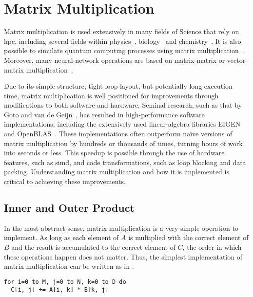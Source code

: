 \documentclass[\main/thesis.tex]{subfiles}
\begin{document}
\chapter{Matrix Multiplication}
\label{cha:matmul}
Matrix multiplication is used extensively in many fields of Science that rely on \gls{hpc}, including several fields within physics~\autocite{krol2014matrix}, biology~\autocite{akutsu2000algorithms} and chemistry~\autocite{weber2015semiempirical}.
It is also possible to simulate quantum computing processes using matrix multiplication~\autocite{zulehner2019matrix}.
Moreover, many neural-network operations are based on matrix-matrix or vector-matrix multiplication~\autocite{rojas1996neural,blue1992training}.

Due to its simple structure, tight loop layout, but potentially long execution time, matrix multiplication is well positioned for improvements through modifications to both software and hardware.
Seminal research, such as that by Goto and van de Geijn~\autocite{goto2008anatomy}, has resulted in high-performance software implementations, including the extensively used linear-algebra libraries EIGEN~\autocite{guennebaud2021eigen} and OpenBLAS~\autocite{xianyi2012model}.
These implementations often outperform na\"ive versions of matrix multiplication by hundreds or thousands of times, turning hours of work into seconds or less.
This speedup is possible through the use of hardware features, such as \gls{simd}, and code transformations, such as loop blocking and data packing.
Understanding matrix multiplication and how it is implemented is critical to achieving these improvements.

\section{Inner and Outer Product}
\label{sec:products}
In the most abstract sense, matrix multiplication is a very simple operation to implement.
As long as each element of $A$ is multiplied with the correct element of $B$ and the result is accumulated to the correct element of $C$, the order in which these operations happen does not matter.
Thus, the simplest implementation of matrix multiplication can be written as in .
\begin{lstlisting}[caption={[Pseudocode for matrix multiplication]Pseudocode implementing matrix multiplication as simply as possible.},label=lst:basicMatMul,columns=flexible]
for i=0 to M, j=0 to N, k=0 to D do
  C[i, j] += A[i, k] * B[k, j]
\end{lstlisting}
\end{document}
